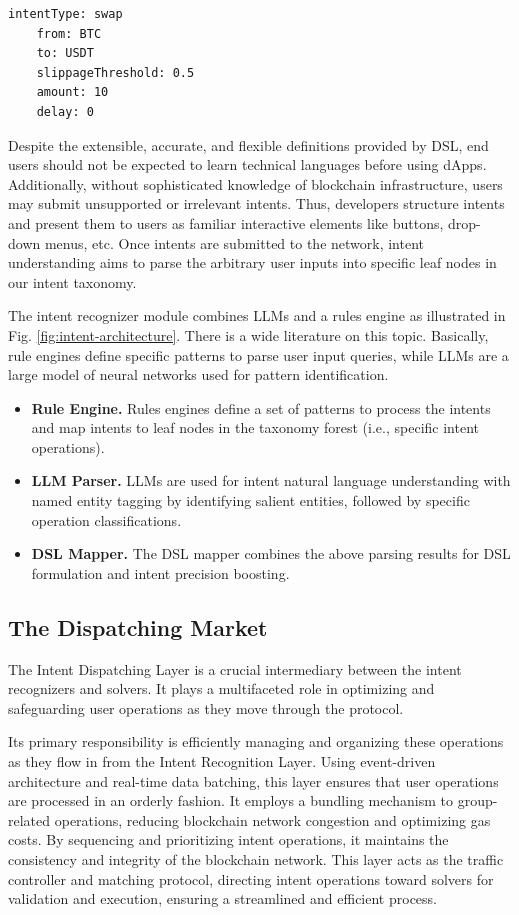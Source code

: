 \documentclass[11pt,letterpaper,twocolumn]{article}
\begin{document}
\begin{lstlisting}[style=yaml]
  intentType: swap
    from: BTC
    to: USDT
    slippageThreshold: 0.5
    amount: 10
    delay: 0
\end{lstlisting}

Despite the extensible, accurate, and flexible definitions provided by DSL, end users should not be expected to learn technical languages before using dApps. Additionally, without sophisticated knowledge of blockchain infrastructure, users may submit unsupported or irrelevant intents. Thus, developers structure intents and present them to users as familiar interactive elements like buttons, drop-down menus, etc. Once intents are submitted to the network, intent understanding aims to parse the arbitrary user inputs into specific leaf nodes in our intent taxonomy.

The intent recognizer module combines LLMs and a rules engine as illustrated in Fig. \ref{fig:intent-architecture}. There is a wide literature on this topic. Basically, rule engines define specific patterns to parse user input queries, while LLMs are a large model of neural networks used for pattern identification.
\begin{itemize}
\item \textbf{Rule Engine.} Rules engines define a set of patterns to process the intents and map intents to leaf nodes in the taxonomy forest (i.e., specific intent operations).
\item \textbf{LLM Parser.} LLMs are used for intent natural language understanding with named entity tagging by identifying salient entities, followed by specific operation classifications.
\item \textbf{DSL Mapper.} The DSL mapper combines the above parsing results for DSL formulation and intent precision boosting.
\end{itemize}

\subsection{The Dispatching Market}
The Intent Dispatching Layer is a crucial intermediary between the intent recognizers and solvers. It plays a multifaceted role in optimizing and safeguarding user operations as they move through the protocol.

Its primary responsibility is efficiently managing and organizing these operations as they flow in from the Intent Recognition Layer. Using event-driven architecture and real-time data batching, this layer ensures that user operations are processed in an orderly fashion. It employs a bundling mechanism to group-related operations, reducing blockchain network congestion and optimizing gas costs. By sequencing and prioritizing intent operations, it maintains the consistency and integrity of the blockchain network. This layer acts as the traffic controller and matching protocol, directing intent operations toward solvers for validation and execution, ensuring a streamlined and efficient process.
\end{document}
